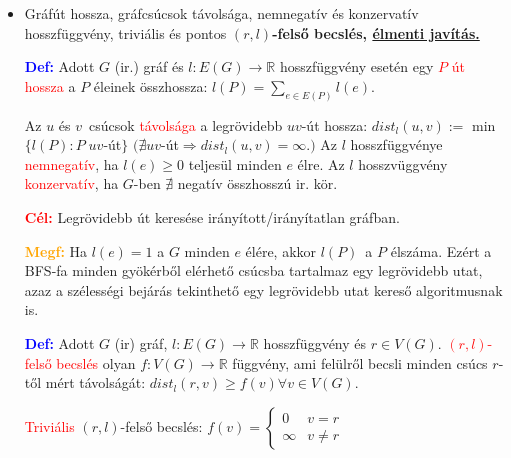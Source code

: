 \documentclass[../../szobeli.tex]{subfiles}
\begin{document}
\begin{center}
    \noindent{}
\end{center}

    \begin{itemize}
        \item Gráfút hossza, gráfcsúcsok távolsága, nemnegatív és konzervatív hosszfüggvény, triviális és pontos $(r,l)$\textbf{-felső becslés, \underline{élmenti javítás.}}
        
            \textbf{\textcolor{blue}{Def:}} Adott $G$ (ir.) gráf és $l : E(G) \rightarrow \mathbb{R}$ hosszfüggvény esetén egy \textcolor{red}{$P$ út hossza} a $P$ éleinek összhossza: $l(P) = \sum_{e\in E(P)} l(e)$.

            Az $u$ és $v$ csúcsok \textcolor{red}{távolsága} a legrövidebb $uv$-út hossza: $dist_l(u,v):=$ min$\{l(P):P \;uv$-út$\}$ $(\nexists uv$-út$\Rightarrow dist_l (u,v)= \infty.)$ Az $l$  hosszfüggvénye \textcolor{red}{nemnegatív}, ha $l(e) \geq 0$ teljesül minden $e$ élre. Az $l$ hosszvüggvény \textcolor{red}{konzervatív}, ha $G$-ben $\nexists$ negatív összhosszú ir. kör.

            \textbf{\textcolor{red}{Cél:}} Legrövidebb út keresése irányított/irányítatlan gráfban.

            \textbf{\textcolor{orange}{Megf:}} Ha $l(e) = 1 $ a $G$ minden $e$ élére, akkor $l(P)$ a $P$ élszáma. Ezért a BFS-fa minden gyökérből elérhető csúcsba tartalmaz egy legrövidebb utat, azaz a szélességi bejárás tekinthető egy legrövidebb utat kereső algoritmusnak is. 

            \textbf{\textcolor{blue}{Def:}} Adott $G$ (ir) gráf, $l : E(G) \rightarrow \mathbb{R}$ hosszfüggvény és $r \in V(G)$. \textcolor{red}{$(r,l)$-felső becslés} olyan $f: V(G) \rightarrow \mathbb{R}$ függvény, ami felülről becsli minden csúcs $r$-től mért távolságát: $dist_l (r,v) \geq f(v) \forall v \in V(G)$.

            \textcolor{red}{Triviális} $(r,l)$-felső becslés:
            $
                f(v) = \begin{cases}
                    0 & v = r \\
                    \infty & v \neq r
                \end{cases}
            $


\end{itemize}
\end{document}
